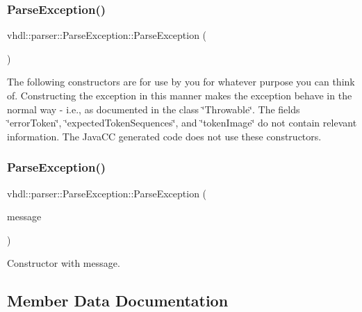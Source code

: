 \subsubsection{\texorpdfstring{ParseException()}{ParseException()}\hspace{0.1cm}{\footnotesize\ttfamily [2/3]}}
{\footnotesize\ttfamily vhdl\+::parser\+::\+Parse\+Exception\+::\+Parse\+Exception (\begin{DoxyParamCaption}{ }\end{DoxyParamCaption})}

The following constructors are for use by you for whatever purpose you can think of. Constructing the exception in this manner makes the exception behave in the normal way -\/ i.\+e., as documented in the class \char`\"{}\+Throwable\char`\"{}. The fields \char`\"{}error\+Token\char`\"{}, \char`\"{}expected\+Token\+Sequences\char`\"{}, and \char`\"{}token\+Image\char`\"{} do not contain relevant information. The Java\+CC generated code does not use these constructors. \mbox{\label{classvhdl_1_1parser_1_1_parse_exception_ac72d242f046713ece19b1ca09b456930}} 
\subsubsection{\texorpdfstring{ParseException()}{ParseException()}\hspace{0.1cm}{\footnotesize\ttfamily [3/3]}}
{\footnotesize\ttfamily vhdl\+::parser\+::\+Parse\+Exception\+::\+Parse\+Exception (\begin{DoxyParamCaption}\item[{J\+A\+V\+A\+C\+C\+\_\+\+S\+T\+R\+I\+N\+G\+\_\+\+T\+Y\+PE}]{message }\end{DoxyParamCaption})}

Constructor with message. 

\subsection{Member Data Documentation}
\mbox{\label{classvhdl_1_1parser_1_1_parse_exception_aadd2253ddf7f1c87444d51fc22efd9fe}} 
